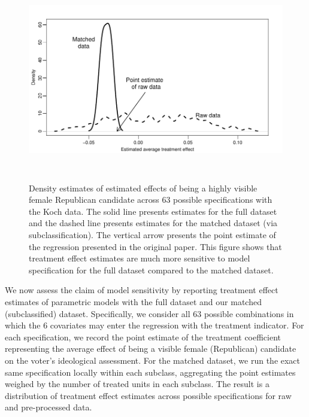 \documentclass[11pt,titlepage]{article}
\begin{document}
\begin{figure}[t]
  \begin{center}
    \includegraphics[height=3.5in,angle=0]{figs/kochdens.pdf}
  \end{center}
  \vspace{-0.275in}
  \caption{Density estimates of estimated effects of being
    a highly visible female Republican candidate across 63 possible
    specifications with the Koch data.  The solid line presents
    estimates for the full dataset and the dashed line presents
    estimates for the matched dataset (via subclassification).  The
    vertical arrow presents the point estimate of the regression
    presented in the original paper.  This figure shows that treatment
    effect estimates are much more sensitive to model specification
    for the full dataset compared to the matched dataset.}
  \label{fg:kochdens}
\end{figure}

We now assess the claim of model sensitivity by reporting treatment
effect estimates of parametric models with the full dataset and our
matched (subclassified) dataset.  Specifically, we consider all 63
possible combinations in which the 6 covariates may enter the
regression with the treatment indicator.  For each specification, we record the point
estimate of the treatment coefficient representing the average effect
of being a visible female (Republican) candidate on the voter's
ideological assessment.  For the matched dataset, we run the exact
same specification locally within each subclass, aggregating the point
estimates weighed by the number of treated units in each subclass.
The result is a distribution of treatment effect estimates across
possible specifications for raw and pre-processed data.  
\end{document}
